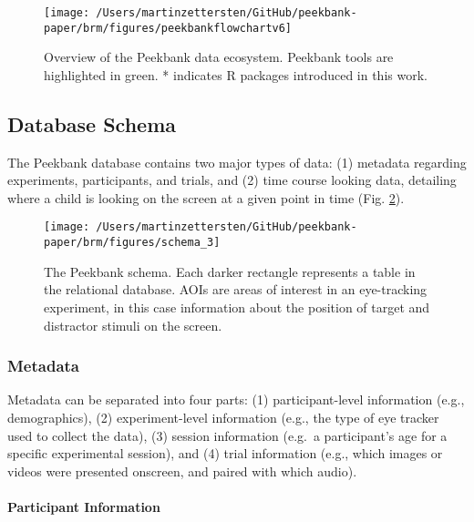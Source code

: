\documentclass[
  english,
  man,floatsintext]{apa6}
\let\oldparagraph\paragraph
\renewcommand{\paragraph}[1]{\oldparagraph{#1}\mbox{}}
\begin{document}
\begin{figure}

{\centering \texttt{[image: /Users/martinzettersten/GitHub/peekbank-paper/brm/figures/peekbankflowchartv6]} 

}

\caption{Overview of the Peekbank data ecosystem. Peekbank tools are highlighted in green. * indicates R packages introduced in this work.}\label{fig:fig-framework-overview}
\end{figure}

\hypertarget{database-schema}{%
\subsection{Database Schema}\label{database-schema}}

The Peekbank database contains two major types of data: (1) metadata regarding experiments, participants, and trials, and (2) time course looking data, detailing where a child is looking on the screen at a given point in time (Fig. \ref{fig:fig-schema}).

\begin{figure}

{\centering \texttt{[image: /Users/martinzettersten/GitHub/peekbank-paper/brm/figures/schema\_3]} 

}

\caption{The Peekbank schema. Each darker rectangle represents a table in the relational database. AOIs are areas of interest in an eye-tracking experiment, in this case information about the position of target and distractor stimuli on the screen.}\label{fig:fig-schema}
\end{figure}

\hypertarget{metadata}{%
\subsubsection{Metadata}\label{metadata}}

Metadata can be separated into four parts: (1) participant-level information (e.g., demographics), (2) experiment-level information (e.g., the type of eye tracker used to collect the data), (3) session information (e.g.~a participant's age for a specific experimental session), and (4) trial information (e.g., which images or videos were presented onscreen, and paired with which audio).

\hypertarget{participant-information}{%
\paragraph{Participant Information}\label{participant-information}}
\end{document}
